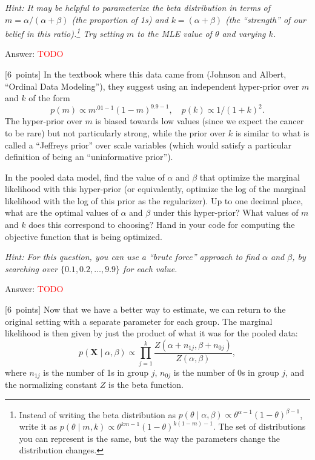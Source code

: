\documentclass{article}
\newcommand{\ask}[1]{\textcolor{question}{#1}}
\newenvironment{answer}{\par\begingroup\color{answer}Answer: }{\endgroup}
\newcommand{\red}[1]{\textcolor{red}{#1}}
\newcommand{\pts}[1]{\textcolor{points}{[#1~points]}}
\newcommand{\hint}[1]{\textcolor{black!60!white}{\emph{Hint: #1}}}
\newcommand{\TODO}{\red{TODO}}
\newcommand{\bX}{\mathbf{X}}
\begin{document}
\begin{qlist}
\hint{%
    It may be helpful to parameterize the beta distribution in terms of
    $m=\alpha/(\alpha+\beta)$ (the proportion of 1s)
    and $k = (\alpha+\beta)$ (the ``strength'' of our belief in this ratio).\footnote{%
        Instead of writing the beta distribution as
        $p(\theta \; | \; \alpha, \beta) \propto \theta^{\alpha-1}(1-\theta)^{\beta-1}$,
        write it as $p(\theta \; | \; m, k) \propto \theta^{km-1}(1-\theta)^{k(1-m)-1}$.
        The set of distributions you can represent is the same,
        but the way the parameters change the distribution changes.}
    Try setting $m$ to the MLE value of $\theta$ and varying $k$.}

\begin{answer}\TODO\end{answer}


\item \pts{6}
    In the textbook where this data came from (Johnson and Albert, ``Ordinal Data Modeling''),
    they suggest using an independent hyper-prior over $m$ and $k$ of the form
    \[ p(m) \propto m^{.01-1}(1-m)^{9.9-1}, \quad p(k) \propto 1/(1+k)^2  .\]
    The hyper-prior over $m$ is biased towards low values (since we expect the cancer to be rare) but not particularly strong,
    while the prior over $k$ is similar to what is called a ``Jeffreys prior'' over scale variables 
    (which would satisfy a particular definition of being an ``uninformative prior'').

    In the pooled data model,
    find the value of $\alpha$ and $\beta$ that optimize the marginal likelihood with this hyper-prior
    (or equivalently, optimize the log of the marginal likelihood with the log of this prior as the regularizer).
    \ask{Up to one decimal place, what are the optimal values of $\alpha$ and $\beta$ under this hyper-prior?
         What values of $m$ and $k$ does this correspond to choosing?
         Hand in your code for computing the objective function that is being optimized.}

    \hint{For this question, you can use a ``brute force'' approach to find $\alpha$ and $\beta$, by searching over $\{0.1, 0.2, \dots, 9.9\}$ for each value.}

\begin{answer}\TODO\end{answer}


\item \label{q:eb:newprior-sep} \pts{6}
    Now that we have a better way to estimate,
    we can return to the original setting with a separate parameter for each group.
    The marginal likelihood is then given by just the product of what it was for the pooled data:
    \[
        p(\bX \mid \alpha, \beta) \propto
        \prod_{j=1}^k \frac{Z(\alpha+n_{1j},\beta + n_{0j})}{Z(\alpha,\beta)}
    ,\]
    where $n_{1j}$ is the number of 1s in group $j$,
    $n_{0j}$ is the number of 0s in group $j$,
    and the normalizing constant $Z$ is the beta function.


\end{qlist}
\end{document}
